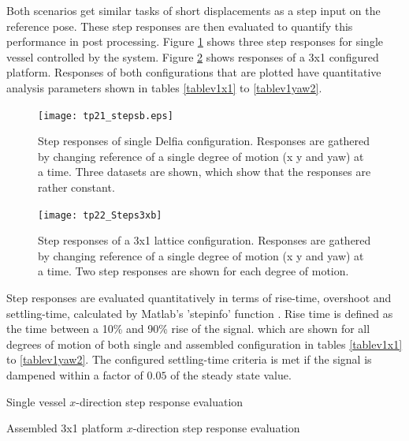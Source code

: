 Both scenarios get similar tasks of short displacements as a step input on the reference pose. These step responses are then evaluated to quantify this performance in post processing. Figure \ref{fig:tp21_steps} shows three step responses for single vessel controlled by the system. Figure \ref{fig:tp22_Steps3x} shows responses of a 3x1 configured platform. Responses of both configurations that are plotted have quantitative analysis parameters shown in tables \ref{tablev1x1} to \ref{tablev1yaw2}.

\begin{figure}[H]
	\centering
	\texttt{[image: tp21\_stepsb.eps]}
	\caption{Step responses of single Delfia configuration. Responses are gathered by changing reference of a single degree of motion (x y and yaw) at a time. Three datasets are shown, which show that the responses are rather constant.}
	\label{fig:tp21_steps}
\end{figure}

\begin{figure}[H]
	\centering
	\texttt{[image: tp22\_Steps3xb]}
	\caption{Step responses of a 3x1 lattice configuration. Responses are gathered by changing reference of a single degree of motion (x y and yaw) at a time. Two step responses are shown for each degree of motion.}
	\label{fig:tp22_Steps3x}
\end{figure}


Step responses are evaluated quantitatively in terms of rise-time, overshoot and settling-time, calculated by Matlab's 'stepinfo' function \cite{stepinfoWebMatlab}.  Rise time is defined as the time between a 10\% and 90\% rise of the signal. 
which are shown for all degrees of motion of both single and assembled configuration in tables \ref{tablev1x1} to \ref{tablev1yaw2}. The configured settling-time criteria is met if the signal is dampened within a factor of $0.05$ of the steady state value. 

\begin{table}[H]
	\captionsetup{justification=centering}
	\begin{adjustbox}{max width=1.3\textwidth,center}
		\begin{minipage}{.55\textwidth}
			\centering
			
			\caption{Single vessel $x$-direction step response evaluation}
			\label{tablev1x1}
		\end{minipage}%
		\begin{minipage}{.55\textwidth}
			\centering
			
			\caption{Assembled 3x1 platform $x$-direction step response evaluation}
			\label{tablev1x2}
		\end{minipage}
	\end{adjustbox}
\end{table}

